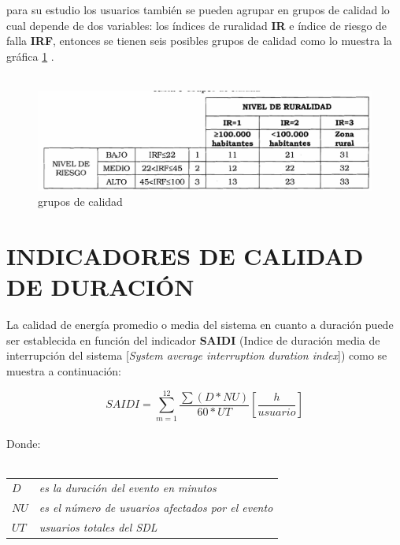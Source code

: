 \documentclass[a5paper]{book}%
\begin{document}
    para su estudio los usuarios también se pueden agrupar en grupos
    de calidad lo cual depende de dos variables: los índices de
    ruralidad \textbf{IR} e índice de riesgo de falla \textbf{IRF},
    entonces se tienen seis posibles grupos de calidad como lo muestra
    la gráfica \ref{fig:gruposcalidad} \cite{CREG0152018}.\\\\

    \begin{figure}[H]
      \centering
      
      \caption{grupos de calidad}
      \label{fig:gruposcalidad}
      \includegraphics[width=\linewidth]{grupos_de_calidad}
    \end{figure}

    \section{INDICADORES DE CALIDAD DE DURACIÓN}

    La calidad  de energía  promedio o media del sistema en cuanto a duración puede ser establecida en función del indicador \textbf{SAIDI} (Indice de duración media de interrupción del sistema [\textit{System average interruption duration index}]) como se muestra a continuación:

    \[ SAIDI  = \sum_{m=1}^{12}\dfrac{\sum(D*NU)}{60*UT}   \left[  \dfrac{h}{usuario} \right]  \]\\
    Donde:\\\\
    \begin{tabular}[H]{p{1cm}p{8cm}}
      
      $D$ & {\small\it es la duración del evento en minutos}\\
      $NU$ & {\small\it es el número de usuarios afectados por el evento} \\
      $UT$ &  {\small\it  usuarios totales del \ac{SDL}} \\
    \end{tabular} \\\\
\end{document}
